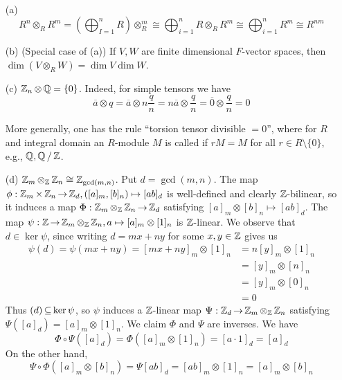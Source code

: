 \documentclass[11pt]{book}
\theoremstyle{definition}   \newtheorem{defn}[counter]{Definition} %
\newcommand{\ov}{\overline}   \newcommand{\wt}{\widetilde}
\newcommand{\bs}{\setminus}   \newcommand{\A}{\mathcal{A}}   \newcommand{\sy}{\textnormal{Syl}}   \newcommand{\size}[1]{\left| #1 \right|}
\DeclareMathOperator{\ra}{\rightarrow}   \DeclareMathOperator{\Poly}{\mathbf{P}}   \DeclareMathOperator{\spn}{\textnormal{span}}   \DeclareMathOperator{\aut}{\textnormal{Aut}}
\newcommand{\vs}{\vspace{8pt}}   \newcommand{\hs}{\hspace{8pt}}
\numberwithin{counter}{chapter}
\begin{document}
\vs

\begin{example}\ 
\begin{enumerate}
\item[(a)] \[R^n \otimes_R R^m = \left(\bigoplus_{I=1}^n R\right) \otimes_R^m \cong \bigoplus_{i=1}^n R \otimes_R R^m \cong \bigoplus_{i=1}^n R^m \cong R^{nm} \]

\item[(b)] (Special case of (a)) If $V,W$ are finite dimensional $F$-vector spaces, then $\dim (V \otimes_R W) = \dim V \dim W$. 

\item[(c)] $\operatorname{\mathbb{Z}}_n \otimes \operatorname{\mathbb{Q}} = \{0\}$. Indeed, for simple tensors we have
	\[ \ov{a} \otimes q = \ov{a} \otimes n \frac{q}{n} = n \ov{a} \otimes \frac{q}{n} = \ov{0} \otimes \frac{q}{n} = 0 \]

More generally, one has the rule ``torsion tensor divisible $= 0$'', where for $R$ and integral domain an $R$-module $M$ is called  if $rM = M$ for all $r \in R \bs \{0\}$, e.g., $\operatorname{\mathbb{Q}}, \operatorname{\mathbb{Q}}/\operatorname{\mathbb{Z}}$. 

\item[(d)] $\operatorname{\mathbb{Z}}_m \otimes_{\operatorname{\mathbb{Z}}} \operatorname{\mathbb{Z}}_n \cong \operatorname{\mathbb{Z}}_{\gcd(m,n)}$. Put $d = \gcd(m,n)$. The map $\phi : \z_m \times \z_n \ra \z_d, ([a]_m,[b]_n) \mapsto [ab]_d$ is well-defined and clearly $\operatorname{\mathbb{Z}}$-bilinear, so it induces a map $\Phi : \z_m \otimes_{\z} \z_n \ra \z_d$ satisfying $[a]_m \otimes [b]_n \mapsto [ab]_d$. The map $\psi : \z \ra \z_m \otimes_{\z} \z_n, a \mapsto [a]_m \otimes [1]_n$ is $\operatorname{\mathbb{Z}}$-linear. We observe that $d \in \ker \psi$, since writing $d = mx + ny$ for some $x,y \in \operatorname{\mathbb{Z}}$ gives us
\begin{align*}
\psi(d) = \psi(mx+ny) = [mx+ny]_m \otimes [1]_n &= n[y]_m \otimes [1]_n \\
&= [y]_m \otimes [n]_n \\
&= [y]_m \otimes [0]_n \\
&= 0
\end{align*}
Thus $(d) \operatorname{\subseteq} \ker \psi$, so $\psi$ induces a $\operatorname{\mathbb{Z}}$-linear map $\Psi : \z_d \ra \z_m \otimes_{\z} \z_n$ satisfying $\Psi([a]_d) = [a]_m \otimes [1]_n$. We claim $\Phi$ and $\Psi$ are inverses. We have
	\[\Phi \circ \Psi ([a]_d) = \Phi([a]_m \otimes [1]_n) = [a \cdot 1]_d = [a]_d \]
On the other hand,
	\[\Psi \circ \Phi ([a]_m \otimes [b]_n) = \Psi [ab]_d = [ab]_m \otimes [1]_n = [a]_m \otimes [b]_n \]
\end{enumerate}
\end{example}

\vs
\end{document}
